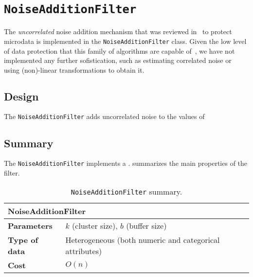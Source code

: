 \section{\texttt{NoiseAdditionFilter}}
\label{Implementation:NoiseAddition}

The \textit{uncorrelated} noise addition mechanism that was reviewed in~ to protect microdata is implemented in the \texttt{NoiseAdditionFilter} class. Given the low level of data protection that this family of algorithms are capable of~\citep{Brand:NoiseAddition}, we have not implemented any further sofistication, such as estimating correlated noise or using (non)-linear transformations to obtain it.

\subsection{Design}
\label{Implementation:NoiseAddition:Design}

The \texttt{NoiseAdditionFilter} adds uncorrelated noise to the values of 

\subsection{Summary}
\label{Implementation:NoiseAddition:Summary}

The \texttt{NoiseAdditionFilter} implements a . summarizes the main properties of the filter.



\begin{table}[h]
	\centering
	\begin{tabular}{@{}ll@{}}
	\toprule
	\multicolumn{2}{l}{\textbf{NoiseAdditionFilter}}                                \\ \midrule
	\textbf{Parameters}   & $k$ (cluster size), $b$ (buffer size)                   \\ %
	\textbf{Type of data} & Heterogeneous (both numeric and categorical attributes) \\
	\textbf{Cost}         & $O(n)$                                                  \\ \bottomrule
	\end{tabular}
	\caption{\texttt{NoiseAdditionFilter} summary.}
	\label{table:noiseaddition-summary}
\end{table}